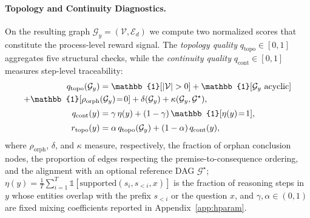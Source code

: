 \paragraph{Topology and Continuity Diagnostics.}
\label{sec:diagnostics}
On the resulting graph $\mathcal{G}_y\!=\!(\mathcal{V},\mathcal{E}_d)$ we compute two normalized scores that constitute the process-level reward signal. The \emph{topology quality} $q_{\mathrm{topo}}\!\in\![0,1]$ aggregates five structural checks, while the \emph{continuity quality} $q_{\mathrm{cont}}\!\in\![0,1]$ measures step-level traceability:
\begin{align}
q_{\mathrm{topo}}(\mathcal{G}_y) &= \mathbb{1}[|\mathcal{V}|>0]
+\mathbb{1}[\mathcal{G}_y\text{ acyclic}] \notag\\
+\mathbb{1}[\rho_{\mathrm{orph}}&(\mathcal{G}_y)\!=\!0]+\delta(\mathcal{G}_y)
+\kappa(\mathcal{G}_y,\mathcal{G}^{\star}), \label{eq:qtopo}\\[2pt]
q_{\mathrm{cont}}(y) &= \gamma\,\eta(y)+(1-\gamma)\,\mathbb{1}[\eta(y)\!=\!1], \label{eq:qcont}\\[2pt]
r_{\mathrm{topo}}(y) &= \alpha\,q_{\mathrm{topo}}(\mathcal{G}_y)+(1-\alpha)\,q_{\mathrm{cont}}(y), \label{eq:rtopo}
\end{align}
where $\rho_{\mathrm{orph}}$, $\delta$, and $\kappa$ measure, respectively, the fraction of orphan conclusion nodes, the proportion of edges respecting the premise-to-consequence ordering, and the alignment with an optional reference DAG $\mathcal{G}^{\star}$; $\eta(y)=\tfrac{1}{T}\sum_{i=1}^{T}\mathbb{1}[\mathrm{supported}(s_i,s_{<i},x)]$
is the fraction of reasoning steps in $y$ whose entities overlap with the prefix $s_{<i}$ or the question $x$, and $\gamma,\alpha\!\in\!(0,1)$ are fixed mixing coefficients reported in Appendix~\ref{app:hparam}.

